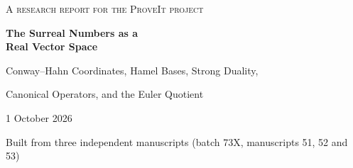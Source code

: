 \documentclass[11pt,letterpaper]{article}
\numberwithin{equation}{section}
\theoremstyle{definition}
\theoremstyle{remark}
\newcommand{\No}{\mathbf{No}}
\newcommand{\R}{\mathbb{R}}
\newcommand{\gr}{\operatorname{gr}}
\begin{document}
\hypersetup{pageanchor=false}
\begin{titlepage}
\centering
\vspace*{-0.25in}
{\large\scshape A research report for the ProveIt project\par}
\vspace{0.22in}
{\Huge\bfseries\color{TitleBlue} The Surreal Numbers as a\\[0.12em] Real Vector Space\par}
\vspace{0.13in}
{\LARGE\color{AccentBlue} Conway--Hahn Coordinates, Hamel Bases, Strong Duality,\par
Canonical Operators, and the Euler Quotient\par}
\vspace{0.18in}
{\large 1 October 2026\par}
\vspace{0.06in}
{\normalsize Built from three independent manuscripts (batch 73X, manuscripts 51, 52 and 53)\par}
\vspace{0.18in}
\begin{minipage}{0.94\textwidth}
\begin{abstract}
\noindent
The surreal numbers form a proper-class vector space over their canonical
copy of \(\R\).  Three manuscripts written independently on the same day
answer the question ``what is its natural basis?'' in the same way and
prove the answer in different ways; this report prints them as one text.
The monomials \(\omega^\gamma\) are a canonical \emph{Hahn} basis (unique
set-supported, reverse-well-ordered strong expansions), the basis of every
one-dimensional layer of the associated graded algebra
\(\gr\No\cong\R[\No]\), and a Hamel basis only of the finite-support
subspace.  No set spans \(\No\); in NBG with global choice a class Hamel
basis exists, may contain every monomial, and must contain a proper class
of infinite-support vectors, with supports of unbounded cardinality.  Every
infinite support window \(A\) has Hamel dimension \(|\R|^{|A|}\), and for
every nonzero set-sized exponent group \(\Gamma\) the finite-monomial part
of \(\R((t^\Gamma))\) has codimension \(|\R((t^\Gamma))|\).


\end{abstract}
\end{minipage}
\end{titlepage}
\end{document}
